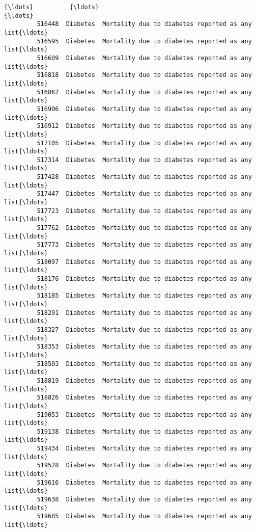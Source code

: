 \documentclass[11pt]{article}
\begin{document}
\begin{Verbatim}[commandchars=\\\{\}]
         {\ldots}          {\ldots}                                                {\ldots}   
         516448  Diabetes  Mortality due to diabetes reported as any list{\ldots}   
         516595  Diabetes  Mortality due to diabetes reported as any list{\ldots}   
         516609  Diabetes  Mortality due to diabetes reported as any list{\ldots}   
         516818  Diabetes  Mortality due to diabetes reported as any list{\ldots}   
         516862  Diabetes  Mortality due to diabetes reported as any list{\ldots}   
         516906  Diabetes  Mortality due to diabetes reported as any list{\ldots}   
         516912  Diabetes  Mortality due to diabetes reported as any list{\ldots}   
         517105  Diabetes  Mortality due to diabetes reported as any list{\ldots}   
         517314  Diabetes  Mortality due to diabetes reported as any list{\ldots}   
         517428  Diabetes  Mortality due to diabetes reported as any list{\ldots}   
         517447  Diabetes  Mortality due to diabetes reported as any list{\ldots}   
         517723  Diabetes  Mortality due to diabetes reported as any list{\ldots}   
         517762  Diabetes  Mortality due to diabetes reported as any list{\ldots}   
         517773  Diabetes  Mortality due to diabetes reported as any list{\ldots}   
         518097  Diabetes  Mortality due to diabetes reported as any list{\ldots}   
         518176  Diabetes  Mortality due to diabetes reported as any list{\ldots}   
         518185  Diabetes  Mortality due to diabetes reported as any list{\ldots}   
         518291  Diabetes  Mortality due to diabetes reported as any list{\ldots}   
         518327  Diabetes  Mortality due to diabetes reported as any list{\ldots}   
         518353  Diabetes  Mortality due to diabetes reported as any list{\ldots}   
         518503  Diabetes  Mortality due to diabetes reported as any list{\ldots}   
         518819  Diabetes  Mortality due to diabetes reported as any list{\ldots}   
         518826  Diabetes  Mortality due to diabetes reported as any list{\ldots}   
         519053  Diabetes  Mortality due to diabetes reported as any list{\ldots}   
         519138  Diabetes  Mortality due to diabetes reported as any list{\ldots}   
         519434  Diabetes  Mortality due to diabetes reported as any list{\ldots}   
         519528  Diabetes  Mortality due to diabetes reported as any list{\ldots}   
         519616  Diabetes  Mortality due to diabetes reported as any list{\ldots}   
         519638  Diabetes  Mortality due to diabetes reported as any list{\ldots}   
         519685  Diabetes  Mortality due to diabetes reported as any list{\ldots}   
         

\end{Verbatim}
\end{document}
